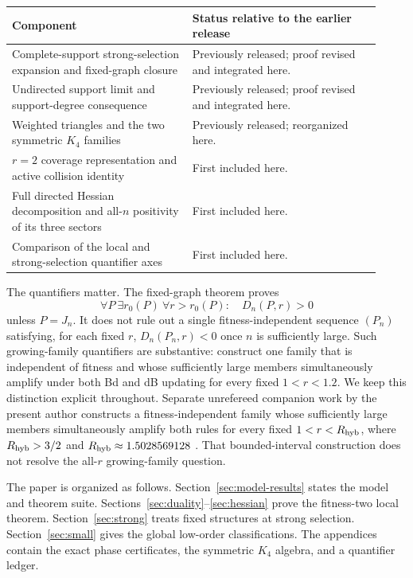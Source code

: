 \begin{center}
\small
\begin{tabular}{@{}>{\raggedright\arraybackslash}p{0.45\linewidth}
                    >{\raggedright\arraybackslash}p{0.47\linewidth}@{}}
\toprule
Component & Status relative to the earlier release\\
\midrule
Complete-support strong-selection expansion and fixed-graph closure
  & Previously released; proof revised and integrated here.\\
Undirected support limit and support-degree consequence
  & Previously released; proof revised and integrated here.\\
Weighted triangles and the two symmetric $K_4$ families
  & Previously released; reorganized here.\\
$r=2$ coverage representation and active collision identity
  & First included here.\\
Full directed Hessian decomposition and all-$n$ positivity of its three sectors
  & First included here.\\
Comparison of the local and strong-selection quantifier axes
  & First included here.\\
\bottomrule
\end{tabular}
\end{center}

The quantifiers matter.  The fixed-graph theorem proves
\[
 \forall P\ \exists r_0(P)\ \forall r>r_0(P):\quad D_n(P,r)>0
\]
unless $P=J_n$.  It does not rule out a single
fitness-independent sequence $(P_n)$ satisfying, for each fixed $r$,
$D_n(P_n,r)<0$ once $n$ is sufficiently large.  Such growing-family
quantifiers are substantive: \citet{Svoboda2024} construct one family that is
independent of fitness and whose sufficiently large members simultaneously
amplify under both Bd and dB updating for every fixed $1<r<1.2$.  We keep
this distinction explicit throughout.  Separate unrefereed companion work by
the present author constructs a fitness-independent family whose sufficiently
large members simultaneously amplify both rules for every fixed
$1<r<R_{\rm hyb}$, where
$R_{\rm hyb}>3/2$ and $R_{\rm hyb}\approx1.5028569128$
\citep{Kriebel2026Hybrid}.  That bounded-interval construction does not
resolve the all-$r$ growing-family question.

The paper is organized as follows.  Section~\ref{sec:model-results} states
the model and theorem suite.  Sections~\ref{sec:duality}--\ref{sec:hessian}
prove the fitness-two local theorem.  Section~\ref{sec:strong} treats fixed
structures at strong selection.  Section~\ref{sec:small} gives the global
low-order classifications.  The appendices contain the exact phase
certificates, the symmetric $K_4$ algebra, and a quantifier ledger.
